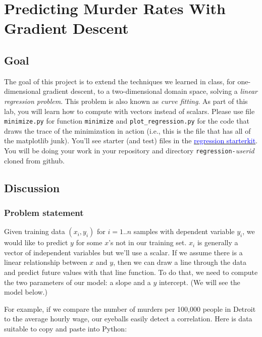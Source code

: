 \documentclass[titlepage]{tufte-book}
\newcounter{problem}
\begin{document}
\chapter{Predicting Murder Rates With Gradient Descent}

\section{Goal}

\begin{fullwidth}

The goal of this project is to extend the techniques we learned in class, for one-dimensional gradient descent, to a two-dimensional domain space, solving a {\em linear regression problem}.  This problem is also known as {\em curve fitting}.  As part of this lab, you will learn how to compute with vectors instead of scalars. Please use file {\tt minimize.py} for function {\tt minimize} and {\tt plot\_regression.py} for the code that draws the trace of the minimization in action (i.e., this is the file that has all of the matplotlib junk).  You'll see starter (and test) files in the \href{https://github.com/parrt/msan501-starterkit/tree/master/regression}{\textcolor{blue}{regression starterkit}}. You will be doing your work in your repository and directory {\tt regression-}{\em userid}{\tt } cloned from github.

\section{Discussion}

\subsection{Problem statement}

Given training data $(x_i, y_i)$ for $i=1..n$ samples with dependent variable $y_i$, we would like to predict $y$ for some $x$'s not in our training set. $x_i$ is generally a vector of independent variables but we'll use a scalar. If we assume there is a linear relationship between $x$ and $y$, then we can draw a line through the data and predict future values with that line function. To do that, we need to compute the two parameters of our model: a slope and a $y$ intercept. (We will see the model below.)

For example, if we compare the number of murders per 100,000 people in Detroit to the average hourly wage, our eyeballs easily detect a correlation.  Here is data suitable to copy and paste into Python:


\end{fullwidth}
\end{document}
